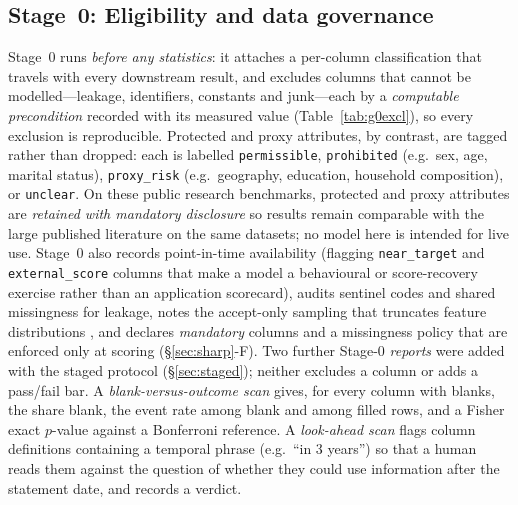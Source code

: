 \documentclass[9pt,journal]{IEEEtai}
\begin{document}
\subsection{Stage~0: Eligibility and data governance}
Stage~0 runs \emph{before any statistics}: it attaches a per-column classification that travels
with every downstream result, and excludes columns that cannot be modelled---leakage,
identifiers, constants and junk---each by a \emph{computable precondition} recorded with its
measured value (Table~\ref{tab:g0excl}), so every exclusion is reproducible. Protected and proxy
attributes, by contrast, are tagged rather than dropped: each is labelled
\texttt{permissible}, \texttt{prohibited} (e.g.\ sex, age, marital status), \texttt{proxy\_risk}
(e.g.\ geography, education, household composition), or \texttt{unclear}. On these public
research benchmarks, protected and proxy attributes are \emph{retained with mandatory
disclosure} so results remain comparable with the large published literature on the same
datasets; no model here is intended for live use. Stage~0 also records point-in-time
availability (flagging \texttt{near\_target} and \texttt{external\_score} columns that make a
model a behavioural or score-recovery exercise rather than an application scorecard), audits
sentinel codes and shared missingness for leakage, notes the accept-only sampling that
truncates feature distributions \cite{handhenley1997}, and declares \emph{mandatory} columns
and a missingness policy that are enforced only at scoring (\S\ref{sec:sharp}-F).
Two further Stage-0 \emph{reports} were added with the staged protocol (\S\ref{sec:staged}); neither
excludes a column or adds a pass/fail bar. A \emph{blank-versus-outcome scan} gives, for every column
with blanks, the share blank, the event rate among blank and among filled rows, and a Fisher exact
$p$-value against a Bonferroni reference. A \emph{look-ahead scan} flags column definitions containing
a temporal phrase (e.g.\ ``in 3 years'') so that a human reads them against the question of whether
they could use information after the statement date, and records a verdict.
\end{document}
